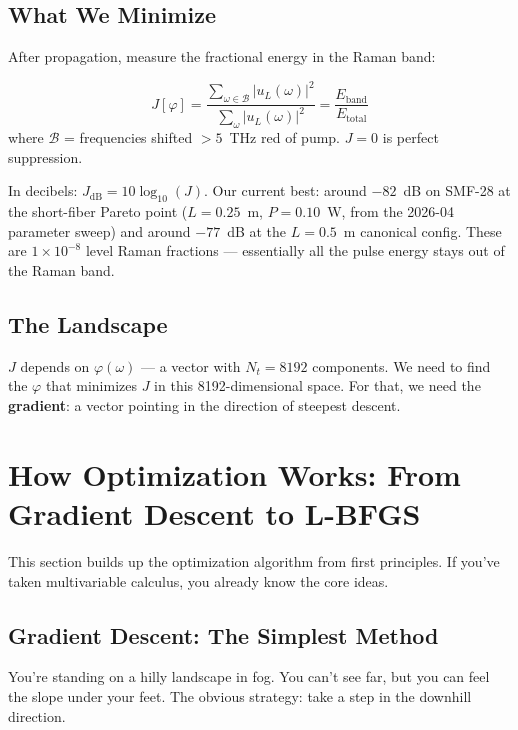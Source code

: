\documentclass[12pt,a4paper]{article}
\begin{document}
\subsection{What We Minimize}

After propagation, measure the fractional energy in the Raman band:
\begin{keyeq}
\begin{equation}
J[\varphi] = \frac{\displaystyle\sum_{\omega\in\mathcal{B}}|u_L(\omega)|^2}{\displaystyle\sum_\omega |u_L(\omega)|^2} = \frac{E_{\text{band}}}{E_{\text{total}}}
\label{eq:cost}
\end{equation}
where $\mathcal{B}$ = frequencies shifted $> 5$~THz red of pump. $J = 0$ is perfect suppression.
\end{keyeq}

In decibels: $J_{\text{dB}} = 10\log_{10}(J)$. Our current best: around $-82$~dB on SMF-28 at the short-fiber Pareto point ($L=0.25$~m, $P=0.10$~W, from the 2026-04 parameter sweep) and around $-77$~dB at the $L=0.5$~m canonical config. These are $1\times10^{-8}$ level Raman fractions --- essentially all the pulse energy stays out of the Raman band.

\subsection{The Landscape}

$J$ depends on $\varphi(\omega)$ --- a vector with $N_t = 8192$ components. We need to find the $\varphi$ that minimizes $J$ in this 8192-dimensional space. For that, we need the \textbf{gradient}: a vector pointing in the direction of steepest descent.


\section{How Optimization Works: From Gradient Descent to L-BFGS}

This section builds up the optimization algorithm from first principles. If you've taken multivariable calculus, you already know the core ideas.

\subsection{Gradient Descent: The Simplest Method}

You're standing on a hilly landscape in fog. You can't see far, but you can feel the slope under your feet. The obvious strategy: take a step in the downhill direction.
\end{document}
